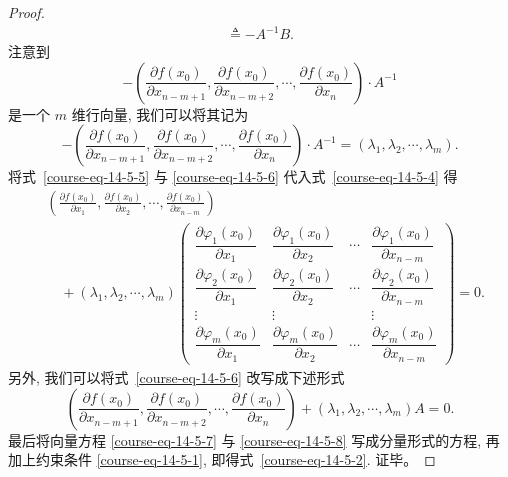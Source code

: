 \documentclass[UTF8,12pt,a4paper,fontset=fandol]{ctexart}
\begin{document}
\begin{proof}
\begin{equation}
\begin{aligned}
  \triangleq -A^{-1}B.
\end{aligned}
\label{course-eq-14-5-5}
\end{equation}
注意到
\[
  -
  \left(
    \frac{\partial f(x_0)}{\partial x_{n-m+1}},
    \frac{\partial f(x_0)}{\partial x_{n-m+2}},
    \cdots,
    \frac{\partial f(x_0)}{\partial x_n}
  \right)\cdot A^{-1}
\]
是一个 $m$ 维行向量, 我们可以将其记为
\begin{equation}
  -
  \left(
    \frac{\partial f(x_0)}{\partial x_{n-m+1}},
    \frac{\partial f(x_0)}{\partial x_{n-m+2}},
    \cdots,
    \frac{\partial f(x_0)}{\partial x_n}
  \right)\cdot A^{-1}
  =(\lambda_1,\lambda_2,\cdots,\lambda_m).
  \label{course-eq-14-5-6}
\end{equation}
将式~\eqref{course-eq-14-5-5}  与 \eqref{course-eq-14-5-6}  代入式~\eqref{course-eq-14-5-4}  得
\begin{equation}
\begin{aligned}
  &\left(
    \frac{\partial f(x_0)}{\partial x_1},
    \frac{\partial f(x_0)}{\partial x_2},
    \cdots,
    \frac{\partial f(x_0)}{\partial x_{n-m}}
  \right)\\
  &\quad+
  (\lambda_1,\lambda_2,\cdots,\lambda_m)
  \begin{pmatrix}
    \dfrac{\partial\varphi_1(x_0)}{\partial x_1} &
    \dfrac{\partial\varphi_1(x_0)}{\partial x_2} &
    \cdots &
    \dfrac{\partial\varphi_1(x_0)}{\partial x_{n-m}}\\
    \dfrac{\partial\varphi_2(x_0)}{\partial x_1} &
    \dfrac{\partial\varphi_2(x_0)}{\partial x_2} &
    \cdots &
    \dfrac{\partial\varphi_2(x_0)}{\partial x_{n-m}}\\
    \vdots & \vdots & & \vdots\\
    \dfrac{\partial\varphi_m(x_0)}{\partial x_1} &
    \dfrac{\partial\varphi_m(x_0)}{\partial x_2} &
    \cdots &
    \dfrac{\partial\varphi_m(x_0)}{\partial x_{n-m}}
  \end{pmatrix}
  =0.
\end{aligned}
\label{course-eq-14-5-7}
\end{equation}
另外, 我们可以将式~\eqref{course-eq-14-5-6}  改写成下述形式
\begin{equation}
  \left(
    \frac{\partial f(x_0)}{\partial x_{n-m+1}},
    \frac{\partial f(x_0)}{\partial x_{n-m+2}},
    \cdots,
    \frac{\partial f(x_0)}{\partial x_n}
  \right)
  +
  (\lambda_1,\lambda_2,\cdots,\lambda_m)
  A=0.
  \label{course-eq-14-5-8}
\end{equation}
最后将向量方程 \eqref{course-eq-14-5-7}  与 \eqref{course-eq-14-5-8}  写成分量形式的方程, 再加上约束条件 \eqref{course-eq-14-5-1}, 即得式~\eqref{course-eq-14-5-2}. 证毕。

\end{proof}
\end{document}
